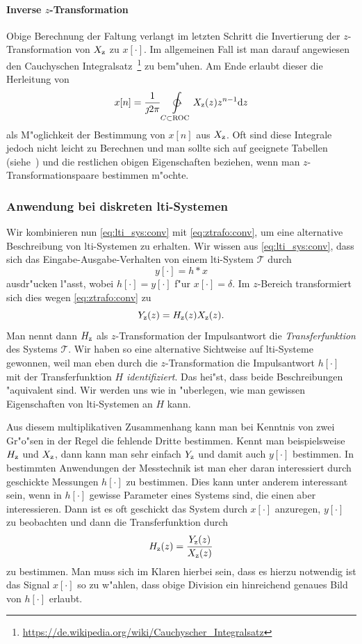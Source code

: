 \paragraph{Inverse \texorpdfstring{$z$}{z}-Transformation}
Obige Berechnung der Faltung verlangt im letzten Schritt die Invertierung der $z$-Transformation von $X_{{\rm z}}$ zu $x[\cdot]$.
Im allgemeinen Fall ist man darauf angewiesen den Cauchyschen Integralsatz~\footnote{\url{https://de.wikipedia.org/wiki/Cauchyscher_Integralsatz}} zu bem"uhen.
Am Ende erlaubt dieser die Herleitung von
\begin{equation}\label{eq:ztrafo:inv}
    x[n] = \frac{1}{\jmath 2 \pi} \ointctrclockwise\limits_{C \subset \mathrm{ROC}} X_{\z}(z) z^{n-1} \mathrm{d}z
\end{equation}
als M"oglichkeit der Bestimmung von $x[n]$ aus $X_{{\rm z}}$.
Oft sind diese Integrale jedoch nicht leicht zu Berechnen und man sollte sich auf geeignete Tabellen (siehe~\cite[Tabelle~3.2,~Tabelle~3.3]{proakis2013}) und die restlichen obigen Eigenschaften beziehen, wenn man $z$-Transformationspaare bestimmen m"ochte.
%
%
\subsubsection{Anwendung bei diskreten \texorpdfstring{\acrshort*{lti}}{LTI}-Systemen}
%
Wir kombinieren nun \eqref{eq:lti_sys:conv} mit \eqref{eq:ztrafo:conv}, um eine alternative Beschreibung von \gls{lti}-Systemen zu erhalten.
Wir wissen aus \eqref{eq:lti_sys:conv}, dass sich das Eingabe-Ausgabe-Verhalten von einem \gls{lti}-System $\mathcal{T}$ durch
\[
y[\cdot] = h \ast x
\]
ausdr"ucken l"asst, wobei $h[\cdot] = y[\cdot]$ f"ur $x[\cdot]=\delta$.
Im $z$-Bereich transformiert sich dies wegen \eqref{eq:ztrafo:conv} zu
\begin{equation}\label{eq:ztrafo:transfer_function}
    Y_{\rm z}(z) = H_{\rm z}(z) X_{\rm z}(z).
\end{equation}
Man nennt dann $H_{{\rm z}}$ als $z$-Transformation der Impulsantwort die \emph{Transferfunktion} des Systems $\mathcal{T}$.
Wir haben so eine alternative Sichtweise auf \gls{lti}-Systeme gewonnen, weil man eben durch die $z$-Transformation die Impulsantwort $h[\cdot]$ mit der Transferfunktion $H$ \emph{identifiziert}.
Das hei"st, dass beide Beschreibungen "aquivalent sind.
Wir werden uns wie in  "uberlegen, wie man gewissen Eigenschaften von \gls{lti}-Systemen an $H$  kann.

Aus diesem multiplikativen Zusammenhang kann man bei Kenntnis von zwei Gr"o"sen in der Regel die fehlende Dritte bestimmen.
Kennt man beispielsweise $H_{\rm z}$ und $X_{\rm z}$, dann kann man sehr einfach $Y_{\rm z}$ und damit auch $y[\cdot]$ bestimmen.
In bestimmten Anwendungen der Messtechnik ist man eher daran interessiert durch geschickte Messungen $h[\cdot]$ zu bestimmen.
Dies kann unter anderem interessant sein, wenn in $h[\cdot]$ gewisse Parameter eines Systems  sind, die einen aber interessieren.
Dann ist es oft geschickt das System durch $x[\cdot]$ anzuregen, $y[\cdot]$ zu beobachten und dann die Transferfunktion durch
\[
H_{\rm z}(z) = \frac{Y_{\rm z}(z)}{X_{\rm z}(z)}
\]
zu bestimmen.
Man muss sich im Klaren hierbei sein, dass es hierzu notwendig ist das Signal $x[\cdot]$ so zu w"ahlen, dass obige Division ein hinreichend genaues Bild von $h[\cdot]$ erlaubt.
%
%
